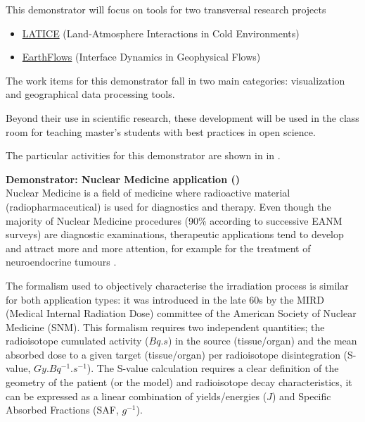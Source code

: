 This demonstrator will focus on tools for two transversal research projects

\begin{itemize}
\item \href{https://www.mn.uio.no/geo/english/research/groups/latice/}{LATICE} (Land-Atmosphere Interactions in Cold Environments)
\item \href{https://www.mn.uio.no/geo/english/research/groups/earthflows/}{EarthFlows} (Interface Dynamics in Geophysical Flows)
\end{itemize}

The work items for this demonstrator fall in two main categories:
visualization and geographical data processing tools.

Beyond their use in scientific research, these development will be used in
the class room for teaching master's students with best practices in open
science.

The particular activities for this demonstrator are shown in
   in .

\medskip
\noindent\textbf{Demonstrator: Nuclear Medicine application ()}\label{sec:concept-demonstrators-opendose}\\
  Nuclear Medicine is a field of medicine where radioactive material
  (radiopharmaceutical) is used for diagnostics and therapy. Even though the
  majority of Nuclear Medicine procedures (90\% according to successive EANM
  surveys) are diagnostic examinations, therapeutic applications tend to
  develop and attract more and more attention, for example for the treatment of
  neuroendocrine tumours \cite{Bodei2009}.

  The formalism used to objectively characterise the irradiation process is
  similar for both application types: it was introduced in the late 60s by the
  MIRD (Medical Internal Radiation Dose) committee of the American Society of
  Nuclear Medicine (SNM). This formalism \cite{loevinger1991mird} requires two
  independent quantities; the radioisotope cumulated activity ($Bq.s$) in the
  source (tissue/organ) and the mean absorbed dose to a given target
  (tissue/organ) per radioisotope disintegration (S-value,
  $Gy.Bq^{-1}.s^{-1}$). The S-value calculation requires a clear definition of
  the geometry of the patient (or the model) and radioisotope decay
  characteristics, it can be expressed as a linear combination of
  yields/energies ($J$) and Specific Absorbed Fractions (SAF, $g^{-1}$).

